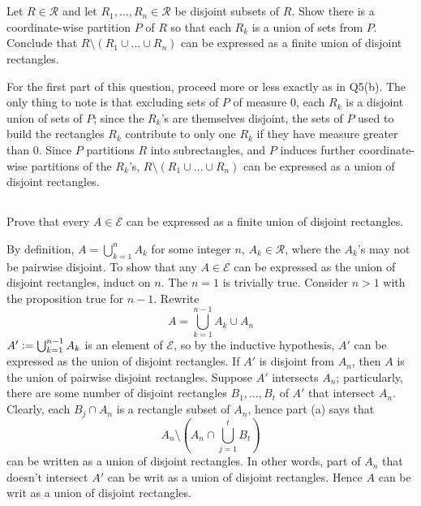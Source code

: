 \documentclass[12pt]{article}
\begin{document}
\section{}
\subsection{}
Let $R \in \mathcal{R}$ and let $R_1, \ldots, R_n \in \mathcal{R}$ be disjoint subsets of $R$. 
Show there is a coordinate-wise partition $P$ of $R$ so that each $R_k$ is a union of sets from $P$.
Conclude that $R \setminus (R_1 \cup \ldots \cup R_n)$ can be expressed as a finite union of disjoint rectangles.

\noindent\dotfill 

For the first part of this question, proceed more or less exactly as in Q5(b). 
The only thing to note is that excluding sets of $P$ of measure 0, each $R_k$ is a disjoint union of sets of $P$; 
since the $R_k$'s are themselves disjoint, the sets of $P$ used to build the rectangles $R_k$ contribute to only one $R_k$ if they have measure greater than 0.  
Since $P$ partitions $R$ into subrectangles, and $P$ induces further coordinate-wise partitions of the $R_k$'s, $R \setminus (R_1 \cup \ldots \cup R_n)$ can be expressed as a union of disjoint rectangles. 

\subsection{} 
Prove that every $A \in \mathscr{E}$ can be expressed as a finite union of disjoint rectangles. 

\noindent\dotfill 

By definition, $A = \bigcup_{k = 1}^{n} A_k$ for some integer $n$, $A_k \in \mathcal{R}$, where the $A_k$'s may not be pairwise disjoint. 
To show that any $A \in \mathcal{E}$ can be expressed as the union of disjoint rectangles, induct on $n$. 
The $n = 1$ is trivially true. 
Consider $n > 1$ with the proposition true for $n - 1$. 
Rewrite
$$A = \bigcup_{k = 1}^{n - 1} A_k \cup A_n$$
$A' \vcentcolon= \bigcup_{k = 1}^{n - 1}A_k$ is an element of $\mathscr{E}$, so by the inductive hypothesis, $A'$ can be expressed as the union of disjoint rectangles. 
If $A'$ is disjoint from $A_n$, then $A$ is the union of pairwise disjoint rectangles. 
Suppose $A'$ intersects $A_n$; 
particularly, there are some number of disjoint rectangles $B_1, \ldots, B_t$ of $A'$ that intersect $A_n$. 
Clearly, each $B_j \cap A_n$ is a rectangle subset of $A_n$, hence part (a) says that 
$$A_n \setminus (A_n \cap \bigcup_{j = 1}^{t} B_t)$$
can be written as a union of disjoint rectangles. 
In other words, part of $A_n$ that doesn't intersect $A'$ can be writ as a union of disjoint rectangles. 
Hence $A$ can be writ as a union of disjoint rectangles. 
\end{document}
